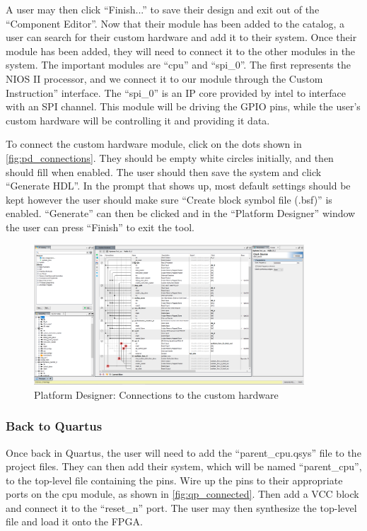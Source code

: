 A user may then click “Finish...” to save their design and exit out of the “Component Editor”. Now that their module has been added to the catalog, a user can search for their custom hardware and add it to their system. Once their module has been added, they will need to connect it to the other modules in the system. The important modules are “cpu” and “spi\_0”. The first represents the NIOS II processor, and we connect it to our module through the Custom Instruction” interface. The “spi\_0” is an IP core provided by intel to interface with an SPI channel. This module will be driving the GPIO pins, while the user's custom hardware will be controlling it and providing it data.

To connect the custom hardware module, click on the dots shown in \autoref{fig:pd_connections}. They should be empty white circles initially, and then should fill when enabled. The user should then save the system and click “Generate HDL”. In the prompt that shows up, most default settings should be kept however the user should make sure “Create block symbol file (.bsf)” is enabled. “Generate” can then be clicked and in the “Platform Designer” window the user can press “Finish” to exit the tool.

\begin{figure}[!h]
    \centering
    \includegraphics[width=0.9\textwidth]{05_evaluation/images/pd_connections.png}
    \caption{Platform Designer: Connections to the custom hardware}
    \label{fig:pd_connections}
\end{figure}

\subsubsection{Back to Quartus}

Once back in Quartus, the user will need to add the “parent\_cpu.qsys” file to the project files. They can then add their system, which will be named “parent\_cpu”, to the top-level file containing the pins. Wire up the pins to their appropriate ports on the cpu module, as shown in \autoref{fig:qp_connected}. Then add a VCC block and connect it to the “reset\_n” port. The user may then synthesize the top-level file and load it onto the FPGA.

